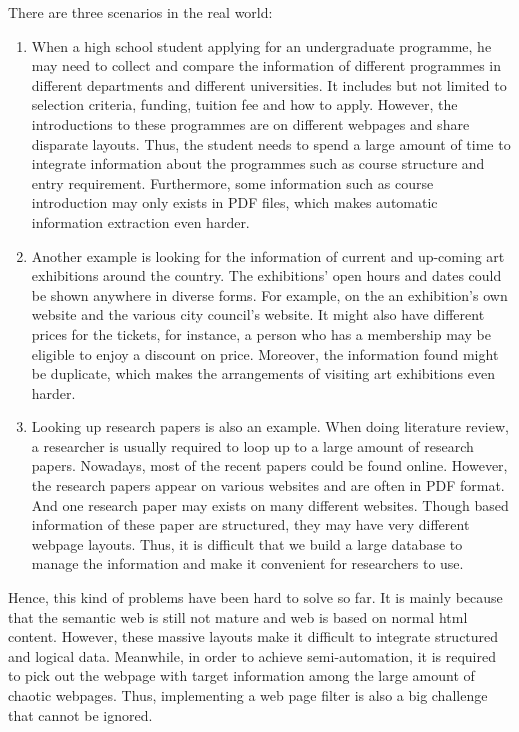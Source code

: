 \noindent There are three scenarios in the real world:
\begin{enumerate}
  \item When a high school student applying for an undergraduate programme, he may need to collect and compare the information of different programmes in different departments and different universities. It includes but not limited to selection criteria, funding, tuition fee and how to apply. However, the introductions to these programmes are on different webpages and share disparate layouts. Thus, the student needs to spend a large amount of time to integrate information about the programmes such as course structure and entry requirement. Furthermore, some information such as course introduction may only exists in PDF files, which makes automatic information extraction even harder.
  \item Another example is looking for the information of current and up-coming art	exhibitions around the country. The exhibitions' open hours and dates could be shown anywhere in diverse forms. For example, on the an exhibition's own website and the various city council's website. It might also have different prices for the tickets, for instance, a person who has a membership may be eligible to enjoy a discount on price. Moreover, the information found might be duplicate, which makes the arrangements of visiting art exhibitions even harder.
  \item Looking up research papers is also an example. When doing literature review, a researcher is usually required to loop up to a large amount of research papers. Nowadays, most of the recent papers could be found online. However, the research papers appear on various websites and are often in PDF format. And one research paper may exists on many different websites. Though based information of these paper are structured, they may have very different webpage layouts. Thus, it is difficult that we build a large database to manage the information and make it convenient for researchers to use.
\end{enumerate}

Hence, this kind of problems have been hard to solve so far. It is mainly because that the semantic web is still not mature and web is based on normal html content. However, these massive layouts make it difficult to integrate structured and logical data. Meanwhile, in order to achieve semi-automation, it is required to pick out the webpage with target information among the large amount of chaotic webpages. Thus, implementing a web page filter is also a big challenge that cannot be ignored.

